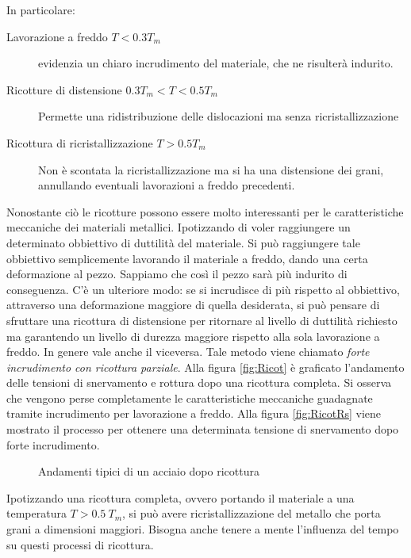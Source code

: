 In particolare:
\begin{description}
\item[Lavorazione a freddo $T < 0.3 T_m$] evidenzia un chiaro incrudimento del materiale, che ne risulterà indurito.
\item[Ricotture di distensione $0.3T_m < T < 0.5 T_m$] Permette una ridistribuzione delle dislocazioni ma senza ricristallizzazione
\item[Ricottura di ricristallizzazione $T > 0.5 T_m$] Non è scontata la ricristallizzazione ma si ha una distensione dei grani, annullando eventuali lavorazioni a freddo precedenti.
\end{description}
Nonostante ciò le ricotture possono essere molto interessanti per le caratteristiche meccaniche dei materiali metallici.
Ipotizzando di voler raggiungere un determinato obbiettivo di duttilità del materiale. Si può raggiungere tale obbiettivo semplicemente lavorando il materiale a freddo, dando una certa deformazione al pezzo.
Sappiamo che così il pezzo sarà più indurito di conseguenza.
C'è un ulteriore modo: se si incrudisce di più rispetto al obbiettivo, attraverso una deformazione maggiore di quella desiderata, si può pensare di sfruttare una ricottura di distensione per ritornare al livello di duttilità richiesto ma garantendo un livello di durezza maggiore rispetto alla sola lavorazione a freddo. In genere vale anche il viceversa. 
Tale metodo viene chiamato \textit{forte incrudimento con ricottura parziale}.
Alla figura \ref{fig:Ricot} è graficato l'andamento delle tensioni di snervamento e rottura dopo una ricottura completa. Si osserva che vengono perse completamente le caratteristiche meccaniche guadagnate tramite incrudimento per lavorazione a freddo.
Alla figura \ref{fig:RicotRs} viene mostrato il processo per ottenere una determinata tensione di snervamento dopo forte incrudimento. 

\begin{figure}
\centering
{}\quad
{}
\caption{Andamenti tipici di un acciaio dopo ricottura}\label{fig:RsRicottura}
\end{figure}

Ipotizzando una ricottura completa, ovvero portando il materiale a una temperatura $T > 0.5\:T_m$, si può avere ricristallizzazione del metallo che porta grani a dimensioni maggiori. Bisogna anche tenere a mente l'influenza del tempo su questi processi di ricottura.


